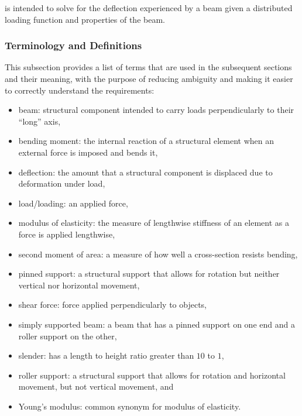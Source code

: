\documentclass[12pt]{article}
\begin{document}
\progname{} is intended to solve for the deflection experienced by a beam given
a distributed loading function and properties of the beam.

\subsubsection{Terminology and  Definitions}

This subsection provides a list of terms that are used in the subsequent
sections and their meaning, with the purpose of reducing ambiguity and making it
easier to correctly understand the requirements:

\begin{itemize}

    \item beam: structural component intended to carry loads perpendicularly to
          their ``long'' axis\nc{},

    \item bending moment: the internal reaction of a structural element when an
          external force is imposed and bends it\nc{},

    \item deflection: the amount that a structural component is displaced due to
          deformation under load\nc{},

    \item load/loading: an applied force\nc{},

    \item modulus of elasticity: the measure of lengthwise stiffness of an
          element as a force is applied lengthwise\nc{},

    \item second moment of area: a measure of how well a cross-section resists
          bending\cite{SmithAdviceAndDiscussion2023},

    \item pinned support: a structural support that allows for rotation but
          neither vertical nor horizontal movement\nc{},

    \item shear force: force applied perpendicularly to objects\nc{},

    \item simply supported beam: a beam that has a pinned support on one end and
          a roller support on the other\nc{},

    \item slender: has a length to height ratio greater than \(10\) to \(1\),

    \item roller support: a structural support that allows for rotation and
          horizontal movement, but not vertical movement\nc{}, and

    \item Young's modulus: common synonym for modulus of elasticity\nc{}.

\end{itemize}
\end{document}

